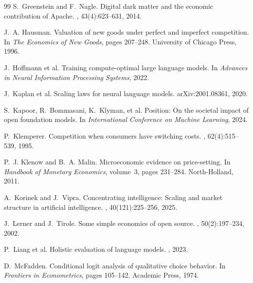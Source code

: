 \documentclass{article}
\begin{document}
\begin{thebibliography}{99}
S.~Greenstein and F.~Nagle.
\newblock Digital dark matter and the economic contribution of Apache.
, 43(4):623--631, 2014.

J.~A. Hausman.
\newblock Valuation of new goods under perfect and imperfect competition.
\newblock In {\em The Economics of New Goods}, pages 207--248. University of Chicago
  Press, 1996.

J.~Hoffmann et al.
\newblock Training compute-optimal large language models.
\newblock In {\em Advances in Neural Information Processing Systems}, 2022.

J.~Kaplan et al.
\newblock Scaling laws for neural language models.
\newblock arXiv:2001.08361, 2020.

S.~Kapoor, R.~Bommasani, K.~Klyman, et al.
\newblock Position: On the societal impact of open foundation models.
\newblock In {\em International Conference on Machine Learning}, 2024.

P.~Klemperer.
\newblock Competition when consumers have switching costs.
, 62(4):515--539, 1995.

P.~J. Klenow and B.~A. Malin.
\newblock Microeconomic evidence on price-setting.
\newblock In {\em Handbook of Monetary Economics}, volume~3, pages 231--284.
  North-Holland, 2011.

A.~Korinek and J.~Vipra.
\newblock Concentrating intelligence: Scaling and market structure in artificial
  intelligence.
, 40(121):225--256, 2025.

J.~Lerner and J.~Tirole.
\newblock Some simple economics of open source.
, 50(2):197--234, 2002.

P.~Liang et al.
\newblock Holistic evaluation of language models.
, 2023.

D.~McFadden.
\newblock Conditional logit analysis of qualitative choice behavior.
\newblock In {\em Frontiers in Econometrics}, pages 105--142. Academic Press, 1974.


\end{thebibliography}
\end{document}

